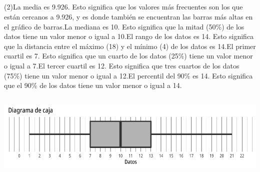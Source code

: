 \documentclass{cdplf-prueba}
\begin{document}
\subsection{}
\begin{tasks}[label={\tcbox[colback=black!60, colframe=black!60, coltext=white, on line, boxsep=0pt, left=3pt, right=3pt, top=2pt, bottom=2pt]{\sffamily\bfseries\alph*}},
item-indent=1.2cm,column-sep=20pt,label-offset=0.3cm,label-width=15pt,after-item-skip=10pt,item-format=\raggedright](2)\task La media es 9.926.
 Esto significa que los valores más frecuentes son los que están cercanos a 9.926, y es donde también se encuentran las barras más altas 
 en el gráfico de barras.\task La mediana es 10. 
 Esto significa que la mitad (50\%) de los datos tiene un valor menor 
 o igual a 10.\task El rango de los datos es 14. Esto 
 significa que la distancia entre el máximo (18) y el mínimo (4) de los datos es 14.\task El primer cuartil es 7. Esto significa que un cuarto de los datos (25\%) tiene un valor 
 menor o igual a 7.\task El tercer cuartil es 12. Esto significa que tres cuartos de los datos (75\%) tiene un valor menor
 o igual a 12.\task El percentil del 90\% es 14. Esto significa que el 90\% de los datos tiene un valor menor o igual a 14.\end{tasks}
\subsection{}
\begin{center}\includegraphics{diagrama_caja_1.pdf}\end{center}
\end{document}
